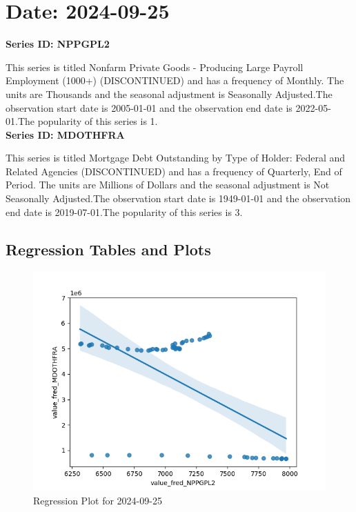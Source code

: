 \section{Date: 2024-09-25}
\noindent \textbf{Series ID: NPPGPL2} 

\noindent This series is titled Nonfarm Private Goods - Producing Large Payroll Employment (1000+) (DISCONTINUED) and has a frequency of Monthly. The units are Thousands and the seasonal adjustment is Seasonally Adjusted.The observation start date is 2005-01-01 and the observation end date is 2022-05-01.The popularity of this series is 1. \\ 

\noindent \textbf{Series ID: MDOTHFRA} 

\noindent This series is titled Mortgage Debt Outstanding by Type of Holder: Federal and Related Agencies (DISCONTINUED) and has a frequency of Quarterly, End of Period. The units are Millions of Dollars and the seasonal adjustment is Not Seasonally Adjusted.The observation start date is 1949-01-01 and the observation end date is 2019-07-01.The popularity of this series is 3. \\ 

\subsection{Regression Tables and Plots}


\begin{figure}
\centering
\includegraphics[scale = 0.9]{plots/plot_2024-09-25.png}
\caption{Regression Plot for 2024-09-25}
\end{figure}
\newpage
